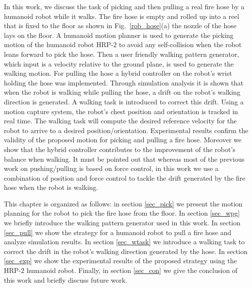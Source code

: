 %
In this work, we discuss the task of picking and then pulling a real fire hose by a humanoid robot while it walks.
%
The fire hose is empty and rolled up into a reel that is fixed to the floor as shown in Fig.~\ref{rob_hose}(a) the nozzle of the hose lays on the floor.
%
A humanoid motion planner is used to generate the picking motion of the humanoid robot HRP-$2$ to avoid any self-collision when the robot leans forward to pick the hose.
%
Then a user friendly walking pattern generator, which input is a velocity relative to the ground plane, is used to generate the walking motion.
%
For pulling the hose a hybrid controller on the robot's wrist holding the hose was implemented.
%
Through simulation analysis it is shown that when the robot is walking while pulling the hose, a drift on the robot's walking direction is generated.
%
A walking task is introduced to correct this drift.
%
Using a motion capture system, the robot's chest position and orientation is tracked in real time.
%
The walking task will compute the desired reference velocity for the robot to arrive to a desired position/orientation.
%
Experimental results confirm the validity of the proposed motion for picking and pulling a fire hose.
%
Moreover we show that the hybrid controller contributes to the improvement of the robot's balance when walking.
%
It must be pointed out that whereas most of the previous work on pushing/pulling is based on force control, in this work we use a combination of position and force control to tackle the drift generated by the fire hose when the robot is walking.


This chapter is organized as follows: 
%
in section \ref{sec_pick} we present the motion planning for the robot to pick the fire hose from the floor.
%
In section \ref{sec_wpg} we briefly introduce the walking pattern generator used in this work.
% 
In section \ref{sec_pull} we show the strategy for a humanoid robot to pull a fire hose and analyze simulation results.
%
In section \ref{sec_wtask} we introduce a walking task to correct the drift in the robot's walking direction generated by the hose.
%
In section \ref{sec_exp} we show the experimental results of the proposed strategy using the HRP-$2$ humanoid robot.
%
Finally, in section \ref{sec_con} we give the conclusion of this work and briefly discuss future work.
